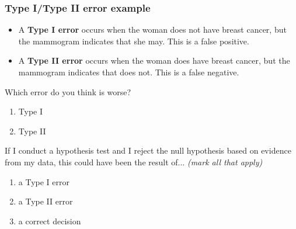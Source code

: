 \begin{frame}
\frametitle{Type I/Type II error example}
\begin{itemize}
    \pause
    \item
    A \textbf{Type I error} occurs when the woman does not have breast cancer, but the mammogram indicates that she may.  This is a false positive.
    \pause
    \item
    A \textbf{Type II error} occurs when the woman does have breast cancer, but the mammogram indicates that does not.  This is a false negative.
\end{itemize}
\pause
\begin{clicker}{Which error do you think is worse?}
\begin{enumerate}
    \item
    Type I
    \item
    Type II
\end{enumerate}
\end{clicker}
\end{frame}

\begin{frame}
\begin{clicker}{If I conduct a hypothesis test and I reject the null hypothesis based on evidence from my data, this could have been the result of... \emph{(mark all that apply)}}
\begin{enumerate}
    \item
    a Type I error
    \item
    a Type II error
    \item
    a correct decision
\end{enumerate}
\end{clicker}
\end{frame}

